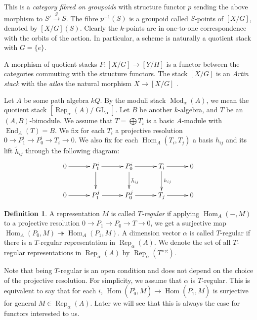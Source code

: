 \documentclass{amsart}
\theoremstyle{definition}
\newtheorem{definition}[theorem]{Definition}
\theoremstyle{remark}
\numberwithin{equation}{section}
\begin{document}
This is a {\em category fibred on groupoids} with structure functor $p$ sending the above morphism to $S'\xrightarrow{g}S$.
The fibre $p^{-1}(S)$ is a groupoid called $S$-points of $[X/G]$, denoted by $[X/G](S)$. Clearly the $k$-points are in one-to-one correspondence with the orbits of the action.
In particular, a scheme is naturally a quotient stack with $G=\{e\}$.

A morphism of quotient stacks $F:[X/G]\to [Y/H]$ is a functor between the categories commuting with the structure functors.
The stack $[X/G]$ is an {\em Artin stack} with the {\em atlas} the natural morphism $X\to [X/G]$ \cite[Example 2.29]{G}.

Let $A$ be some path algebra $kQ$. By the moduli stack ${\operatorname{Mod}}_\alpha(A)$, we mean the quotient stack $[{\operatorname{Rep}}_\alpha(A)/{\operatorname{GL}}_\alpha]$.
Let $B$ be another $k$-algebra, and $T$ be an $(A,B)$-bimodule. We assume that $T=\bigoplus T_i$ is a basic $A$-module with ${\operatorname{End}}_A(T)=B$. We fix for each $T_i$ a projective resolution $0\to P_1^i\to P_0^i\to T_i\to 0$. We also fix for each ${\operatorname{Hom}}_A(T_i,T_j)$ a basis $h_{ij}$ and its lift $\tilde{h}_{ij}$ through the following diagram:
$$\xymatrix @C=2.5pc {
0 \ar[r] & P_1^i \ar[r] \ar[d]  & P_0^i \ar[r]^{} \ar[d]^{\tilde{h}_{ij}} &  T_i \ar[d]^{h_{ij}} \ar[r] & 0\\
0 \ar[r] & P_1^j \ar[r]  & P_0^j \ar[r] & T_j \ar[r] & 0\\
}$$
\begin{definition} A representation $M$ is called {\em $T$-regular} if applying ${\operatorname{Hom}}_A(-,M)$ to a projective resolution $0\to P_1\to P_0\to T\to 0$, we get a surjective map ${\operatorname{Hom}}_A(P_0,M)\twoheadrightarrow{\operatorname{Hom}}_A(P_1,M)$. A dimension vector $\alpha$ is called $T$-regular if there is a $T$-regular representation in ${\operatorname{Rep}}_\alpha(A)$. We denote the set of all $T$-regular representations in ${\operatorname{Rep}}_\alpha(A)$ by ${\operatorname{Rep}}_\alpha(T^{{\operatorname{reg}}})$.
\end{definition}
Note that being $T$-regular is an open condition and does not depend on the choice of the projective resolution.
For simplicity, we assume that $\alpha$ is $T$-regular. This is equivalent to say that for each $i$, ${\operatorname{Hom}}(P_0^i,M)\to{\operatorname{Hom}}(P_1^i,M)$ is surjective for general $M\in{\operatorname{Rep}}_\alpha(A)$.
Later we will see that this is always the case for functors interested to us.
\end{document}
